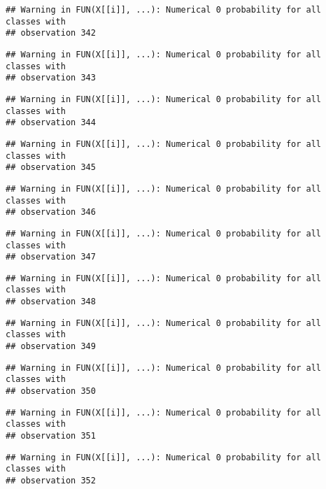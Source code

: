 \documentclass[
]{article}
\begin{document}
\begin{verbatim}
## Warning in FUN(X[[i]], ...): Numerical 0 probability for all classes with
## observation 342
\end{verbatim}

\begin{verbatim}
## Warning in FUN(X[[i]], ...): Numerical 0 probability for all classes with
## observation 343
\end{verbatim}

\begin{verbatim}
## Warning in FUN(X[[i]], ...): Numerical 0 probability for all classes with
## observation 344
\end{verbatim}

\begin{verbatim}
## Warning in FUN(X[[i]], ...): Numerical 0 probability for all classes with
## observation 345
\end{verbatim}

\begin{verbatim}
## Warning in FUN(X[[i]], ...): Numerical 0 probability for all classes with
## observation 346
\end{verbatim}

\begin{verbatim}
## Warning in FUN(X[[i]], ...): Numerical 0 probability for all classes with
## observation 347
\end{verbatim}

\begin{verbatim}
## Warning in FUN(X[[i]], ...): Numerical 0 probability for all classes with
## observation 348
\end{verbatim}

\begin{verbatim}
## Warning in FUN(X[[i]], ...): Numerical 0 probability for all classes with
## observation 349
\end{verbatim}

\begin{verbatim}
## Warning in FUN(X[[i]], ...): Numerical 0 probability for all classes with
## observation 350
\end{verbatim}

\begin{verbatim}
## Warning in FUN(X[[i]], ...): Numerical 0 probability for all classes with
## observation 351
\end{verbatim}

\begin{verbatim}
## Warning in FUN(X[[i]], ...): Numerical 0 probability for all classes with
## observation 352
\end{verbatim}
\end{document}
